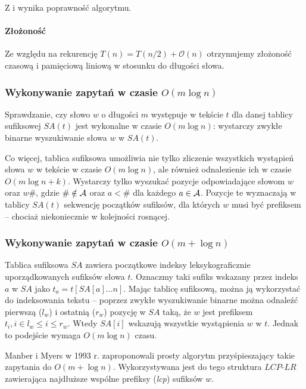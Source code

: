 Z  i  wynika poprawność algorytmu.


\paragraph{Złożoność}
Ze względu na rekurencję $T(n) = T(n/2) + \mathcal{O}(n)$ otrzymujemy złożoność czasową i pamięciową liniową w stosunku do długości słowa.



\subsubsection{Wykonywanie zapytań w czasie $O(m \log{n})$}

Sprawdzanie, czy słowo $w$ o długości $m$ występuje w tekście $t$ dla danej tablicy sufiksowej $SA(t)$ jest wykonalne w czasie $O(m \log{n})$: wystarczy zwykłe binarne wyszukiwanie słowa $w$ w $SA(t)$.

Co więcej, tablica sufiksowa umożliwia nie tylko zliczenie wszystkich wystąpień słowa $w$ w tekście w czasie $O(m \log{n})$, ale również odnalezienie ich w czasie $O(m \log{n} + k)$. Wystarczy tylko wyszukać pozycje odpowiadające słowom $w$ oraz $w\#$, gdzie $\# \notin \operatorname{\mathcal{A}}$ oraz $a < \#$ dla każdego $a \in \operatorname{\mathcal{A}}$. Pozycje te wyznaczają w tablicy $SA(t)$ sekwencję początków sufiksów, dla których $w$ musi być prefiksem -- chociaż niekoniecznie w kolejności rosnącej.

\subsubsection{Wykonywanie zapytań w czasie $O(m + \log{n})$}

Tablica sufiksowa $SA$ zawiera początkowe indeksy leksykograficznie uporządkowanych sufiksów słowa $t$. Oznaczmy taki sufiks wskazany przez indeks $a$ w $SA$ jako $t_a = t[SA[a]\ldots n]$. Mając tablicę sufiksową, można ją wykorzystać do indeksowania tekstu -- poprzez zwykłe wyszukiwanie binarne można odnaleźć pierwszą ($l_w$) i ostatnią ($r_w$) pozycję w $SA$ taką, że $w$ jest prefiksem $t_i, i \in l_w \leq i \leq r_w$. Wtedy $SA[i]$ wskazują wszystkie wystąpienia $w$ w $t$. Jednak to podejście wymaga $O(m \log{n})$ czasu.

Manber i Myers w 1993 r. zaproponowali prosty algorytm przyśpieszający takie zapytania do $O(m + \log{n})$. Wykorzystywana jest do tego struktura $LCP\textrm{-}LR$ zawierająca najdłuższe wspólne prefiksy (\textit{lcp}) sufiksów $w$. 

